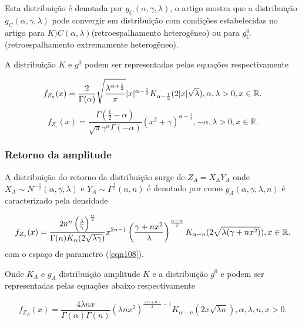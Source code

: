 Esta distribuição é denotada por $g_{C}(\alpha,\gamma,\lambda)$, o artigo mostra que a distribuição $g_{C}(\alpha,\gamma,\lambda)$ pode convergir em distribuição com condições estabelecidas no artigo para $K){C}(\alpha,\lambda)$(retroespalhamento heterogêneo) ou para $g_{C}^{0}$ (retroespalhamento extremamente heterogêneo).

A distribuição $K$ e $g^0$ podem ser representadas pelas equações respectivamente

\begin{equation}\label{eqn109}
	f_{Z_{\circ}}(x)=\frac{2}{\Gamma(\alpha)}\sqrt{\frac{\lambda^{\alpha+\frac{1}{2}}}{\pi}} |x|^{\alpha-\frac{1}{2}}K_{\alpha-\frac{1}{2}}(2|x|\sqrt{\lambda}), \alpha,\lambda>0, x\in\mathbb{R}. \\
\end{equation}
\begin{equation}\label{eqn110}
	f_{Z_{\circ}}(x)=\frac{\Gamma(\frac{1}{2}-\alpha)}{\sqrt{\pi}\gamma^{\alpha}\Gamma(-\alpha)}\left(x^2+\gamma\right)^{\alpha-\frac{1}{2}}, -\alpha,\lambda>0, x\in\mathbb{R}. 
\end{equation}

\subsubsection{Retorno da amplitude}

A distribuição do retorno da distribuição surge de $Z_{A}=X_{A}Y_{A}$ onde $X_{A}\sim N^{-\frac{1}{2}}(\alpha,\gamma,\lambda)$  e $Y_{A}\sim\Gamma^{\frac{1}{2}}(n,n)$ é denotado por como $g_{A}(\alpha,\gamma,\lambda,n)$ é caracterizado pela densidade  

\begin{equation}\label{eqn111}
	f_{Z_{\circ}}(x)=\frac{2n^n\left(\frac{\lambda}{\gamma}\right)^{\frac{\alpha}{2}}}{\Gamma(n)K_{\alpha}(2\sqrt{\lambda\gamma})}x^{2n-1}\left(\frac{\gamma+nx^2}{\lambda}\right)^{\frac{\alpha-n}{2}}K_{\alpha-n}(2\sqrt{\lambda(\gamma+nx^2)}), x\in\mathbb{R}. \\
\end{equation}
com o espaço de parametro (\ref{eqn108}).

Onde $K_{A}$ e $g_{A}$  distribuição amplitude $K$ e a distribuição $g^0$ e podem ser representadas pelas equações abaixo respectivamente

\begin{equation}\label{eqn112}
	f_{Z_{A}}(x)= \frac{4\lambda n x}{\Gamma(\alpha)\Gamma(n)}(\lambda n x^2)^{\frac{(\alpha+n)}{2}-1} K_{\alpha-n}(2x\sqrt{\lambda n}), \alpha,\lambda,n, x>0. 
\end{equation}

